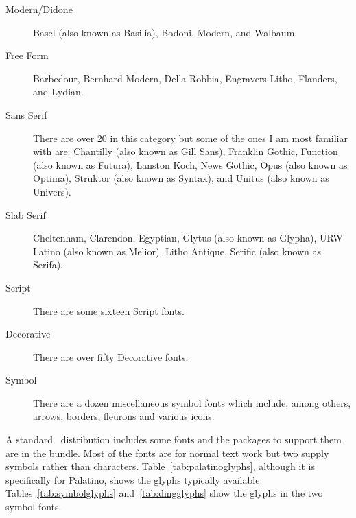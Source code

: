 {\begin{description}
\item[Modern/Didone]
Basel (also known as Basilia),
Bodoni,
Modern, and
Walbaum.

\item[Free Form]
Barbedour,
Bernhard Modern,
Della Robbia,
Engravers Litho,
Flanders, and
Lydian.

\item[Sans Serif]
There are over 20 in this category but some of the ones I am most familiar
with are: 
Chantilly (also known as Gill Sans),
Franklin Gothic,
Function (also known as  Futura),
Lanston Koch,
News Gothic,
Opus (also known as Optima),
Struktor (also known as Syntax), and
Unitus (also known as Univers).

\item[Slab Serif]
Cheltenham,
Clarendon,
Egyptian,
Glytus (also known as Glypha),
URW Latino (also known as Melior),
Litho Antique,
Serific (also known as Serifa).

\item[Script]
There are some sixteen Script fonts.

\item[Decorative]
There are over fifty Decorative fonts.

\item[Symbol]
There are a dozen miscellaneous symbol fonts which include, among others,
arrows, borders, fleurons and various icons.
\end{description}
}  %

    A standard \ltx\ distribution includes some 
\pscript{} fonts and the packages to support
them are in the 
bundle. Most of the fonts are for normal text work but two supply
symbols rather than characters. Table~\ref{tab:palatinoglyphs}, although it
is specifically for Palatino, shows the glyphs 
typically available. Tables~\ref{tab:symbolglyphs} and~\ref{tab:dingglyphs}
show the glyphs in the two symbol fonts.

